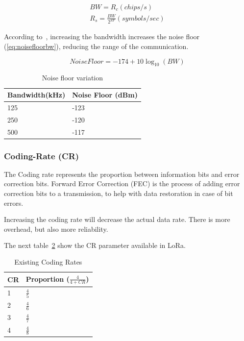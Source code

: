 \begin{gather}
 \label{eq:bw} 
  BW = R_c (chips/s) \\
  R_s = \frac{BW}{2^{SF}} (symbols / sec)
\end{gather}

According to~\cite{semtech:modulationbasics}, increasing the
bandwidth increases the noise floor (\ref{eq:noisefloorbw}), reducing the
range of the communication.

\begin{equation}
 \label{eq:noisefloorbw} 
  Noise Floor = -174 + 10 \log_{10}(BW)
\end{equation}


\begin{table}[h!]
\centering
\begin{tabular}{@{}ll@{}}
Bandwidth(kHz) & Noise Floor (dBm) \\ \midrule
125            & -123              \\
250            & -120              \\
500            & -117              \\ \bottomrule
\end{tabular}
\caption{Noise floor variation\label{table:bw}}
\end{table}


\subsubsection{Coding-Rate (CR)}

The Coding rate represents the proportion between information bits and error
correction bits. 
Forward Error Correction (FEC) is the process of adding error correction bits to a
transmission, to help with data restoration in case of bit errors.

Increasing the coding rate will decrease the actual data rate. 
There is more overhead, but also more reliability.

The next table~\ref{table:cr} show the CR parameter available in LoRa.

\begin{table}[h!]
\centering
\begin{tabular}{@{}ll@{}}
\hline
CR & Proportion ($\frac{4}{4 + CR}$) \\ \midrule
1                                                & $\frac{4}{5}$\\
2                                                & $\frac{4}{6}$\\
3                                                & $\frac{4}{7}$\\
4                                                & $\frac{4}{8}$\\ \bottomrule
\end{tabular}
\caption{Existing Coding Rates\label{table:cr}}
\end{table}

